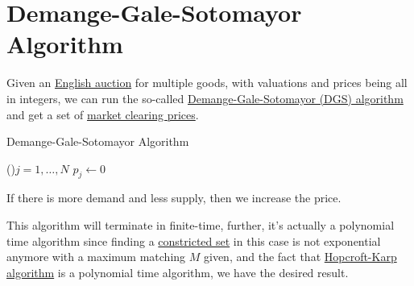 \section{Demange-Gale-Sotomayor Algorithm}
Given an \hyperref[eg:English-auction]{English auction} for multiple goods, with valuations and prices being all in integers, we can run the
so-called \hyperref[algo:Demange-Gale-Sotomayor-algorithm]{Demange-Gale-Sotomayor (DGS) algorithm} and get a set of
\hyperref[note:market-clearing-prices]{market clearing prices}.

\par
\begin{algorithm}[H]\label{algo:Demange-Gale-Sotomayor-algorithm}
	\DontPrintSemicolon
	\caption{Demange-Gale-Sotomayor Algorithm}
	\BlankLine

	\For(){\(j = 1, \ldots  , N\)}{
		\(p_j\gets 0\)\;
	}
	\;
\end{algorithm}

\begin{intuition}
	If there is more demand and less supply, then we increase the price.
\end{intuition}

\begin{remark}
	This algorithm will terminate in finite-time, further, it's actually a polynomial time algorithm since finding a \hyperref[def:constricted-set]{constricted set}
	in this case is not exponential anymore with a maximum matching \(M\) given, and the fact that \hyperref[algo:Hopcroft-Karp-algorithm]{Hopcroft-Karp algorithm}
	is a polynomial time algorithm, we have the desired result.
\end{remark}

